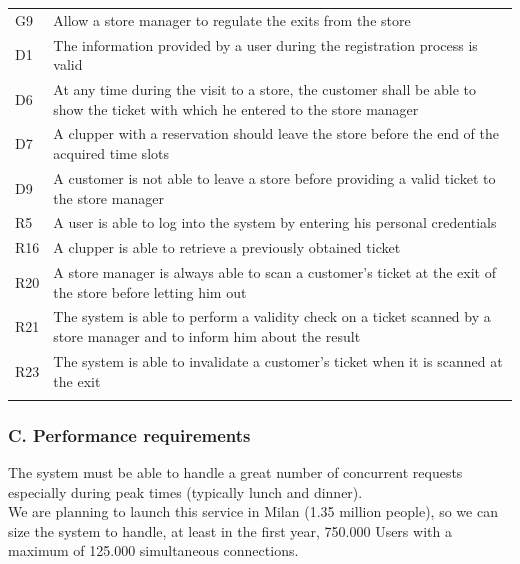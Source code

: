 \begin{longtable}[]{@{}
  >{\raggedright\arraybackslash}p{}
  >{\raggedright\arraybackslash}p{}@{}}
\toprule
G9 & Allow a store manager to regulate the exits from the
store \\ \addlinespace
\midrule
\endhead
D1 & The information provided by a user during the registration process
is valid \\ \addlinespace
D6 & At any time during the visit to a store, the customer shall be able
to show the ticket with which he entered to the store
manager \\ \addlinespace
D7 & A clupper with a reservation should leave the store before the end
of the acquired time slots \\ \addlinespace
D9 & A customer is not able to leave a store before providing a valid
ticket to the store manager \\ \addlinespace
R5 & A user is able to log into the system by entering his personal
credentials \\ \addlinespace
R16 & A clupper is able to retrieve a previously obtained
ticket \\ \addlinespace
R20 & A store manager is always able to scan a customer's ticket at the
exit of the store before letting him out \\ \addlinespace
R21 & The system is able to perform a validity check on a ticket scanned
by a store manager and to inform him about the result \\ \addlinespace
R23 & The system is able to invalidate a customer's ticket when it is
scanned at the exit \\ \addlinespace
\bottomrule
\end{longtable}

\hypertarget{c.-performance-requirements}{%
\subsubsection{C. Performance
requirements}\label{c.-performance-requirements}}

The system must be able to handle a great number of concurrent requests
especially during peak times (typically lunch and dinner).\\
We are planning to launch this service in Milan (1.35 million people),
so we can size the system to handle, at least in the first year, 750.000
Users with a maximum of 125.000 simultaneous connections.

